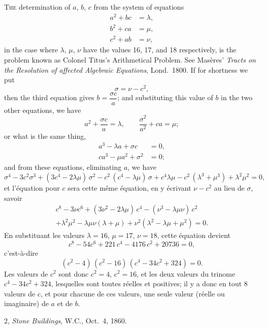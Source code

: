 \documentclass[11pt,a4paper]{book}
\begin{document}
\textsc{The} determination of $a$, $b$, $c$ from the system of equations
\begin{align*}
a^2 + bc &= \lambda, \\
b^2 + ca &= \mu, \\
c^2 + ab &= \nu,
\end{align*}
in the case where $\lambda$, $\mu$, $\nu$ have the values 16, 17, and 18 respectively, is the problem known as Colonel Titus's Arithmetical Problem. See Mas\`{e}res' \textit{Tracts on the Resolution of affected Algebraic Equations}, Lond.~1800. If for shortness we put
\[
\sigma = \nu - c^2,
\]
then the third equation gives $b = \dfrac{\sigma c}{a}$; and substituting this value of $b$ in the two other equations, we have
\[
a^2 + \frac{\sigma c}{a} = \lambda, \qquad \frac{\sigma^2}{a^2} + ca = \mu;
\]
or what is the same thing,
\begin{align*}
a^3 - \lambda a + \sigma c &= 0, \\
ca^3 - \mu a^2 + \sigma^2 &= 0;
\end{align*}
and from these equations, eliminating $a$, we have
\[
\sigma^4 - 3c^2\sigma^3 + (3c^4 - 2\lambda\mu)\,\sigma^2 - c^2\,(c^4 - \lambda\mu)\,\sigma + c^4\lambda\mu - c^2\,(\lambda^3 + \mu^3) + \lambda^2\mu^2 = 0,
\]
et l'\'{e}quation pour $c$ sera cette m\^{e}me \'{e}quation, en y \'{e}crivant $\nu - c^2$ au lieu de $\sigma$, savoir
\begin{multline*}
c^8 - 3\nu c^6 + (3\nu^2 - 2\lambda\mu)\,c^4 - (\nu^3 - \lambda\mu\nu)\,c^2 \\
+ \lambda^2\mu^2 - \lambda\mu\nu(\lambda + \mu) + \nu^2(\lambda^2 - \lambda\mu + \mu^2) = 0.
\end{multline*}
En substituant les valeurs $\lambda=16$, $\mu=17$, $\nu=18$, cette \'{e}quation devient
\[
c^8 - 54c^6 + 221\,c^4 - 4176\,c^2 + 20736 = 0,
\]
c'est-\`{a}-dire
\[
(c^2-4)\,(c^2-16)\,(c^4-34c^2+324) = 0.
\]
Les valeurs de $c^2$ sont donc $c^2=4$, $c^2=16$, et les deux valeurs du trinome $c^4-34c^2+324$, lesquelles sont toutes r\'{e}elles et positives; il y a donc en tout 8 valeurs de $c$, et pour chacune de ces valeurs, une seule valeur (r\'{e}elle ou imaginaire) de $a$ et de $b$.

\begin{flushright}
2, \textit{Stone Buildings}, W.C., Oct.~4, 1860.
\end{flushright}


\end{document}
